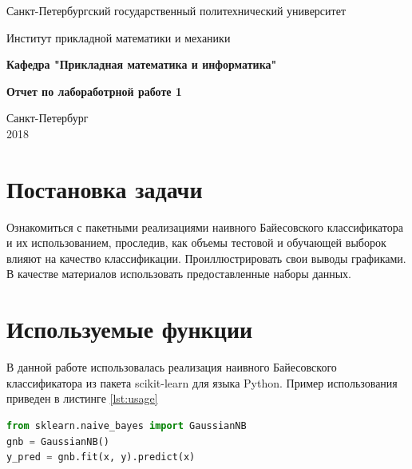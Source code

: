 \documentclass[a4paper,14pt]{article}
\begin{document}
\begin{titlepage}
\newpage

\begin{center}
Санкт-Петербургский государственный политехнический университет \\
\end{center}

\begin{center}
Институт прикладной математики и механики \\ 
\end{center}

\begin{center}
\textbf{Кафедра "Прикладная математика и информатика"} \\ 
\end{center}

\vspace{2em}

\begin{center}
\LARGE{\textbf{Отчет по лабоработрной работе 1}}
\end{center}

\vspace{14em}


\begin{center}
Санкт-Петербург \\2018
\end{center}

\end{titlepage}

\section{Постановка задачи}

Ознакомиться с пакетными реализациями наивного Байесовского классификатора и их использованием, проследив, как объемы тестовой и обучающей выборок влияют на качество классификации. Проиллюстрировать свои выводы графиками. В качестве материалов использовать предоставленные наборы данных.

\section{Используемые функции}

В данной работе использовалась реализация наивного Байесовского классификатора из пакета scikit-learn для языка Python. Пример использования приведен в листинге \ref{lst:usage}

\begin{lstlisting}[caption={Использование байесовского классификатора из пакета scikit-learn}, label={lst:usage}, language=Python]
from sklearn.naive_bayes import GaussianNB
gnb = GaussianNB()
y_pred = gnb.fit(x, y).predict(x)
\end{lstlisting}
\end{document}
